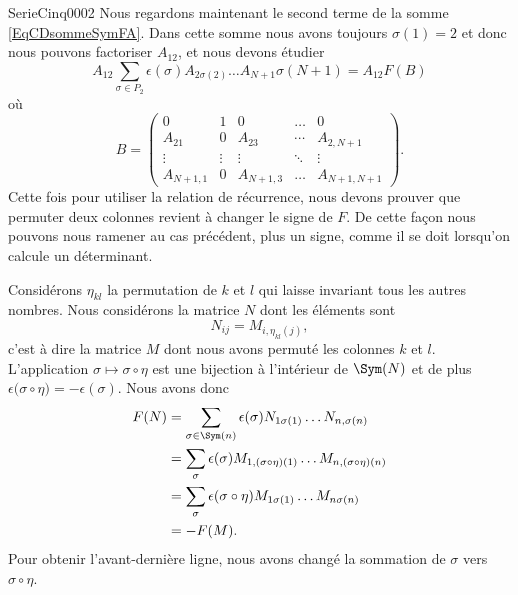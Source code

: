 \begin{corrige}{SerieCinq0002}
Nous regardons maintenant le second terme de la somme \eqref{EqCDsommeSymFA}. Dans cette somme nous avons toujours $\sigma(1)=2$ et donc nous pouvons factoriser $A_{12}$, et nous devons étudier
\begin{equation}
		A_{12}\sum_{\sigma\in P_2}\epsilon(\sigma)A_{2\sigma(2)}\ldots A_{N+1}\sigma(N+1)
		=A_{12}F(B)
\end{equation}
où
\begin{equation}
	B=\begin{pmatrix}
		0		&	1	&	0	&	\ldots	&	0\\	
		A_{21}		&	0	&	A_{23}	&	\cdots	&	A_{2,N+1}\\	
		\vdots		&	\vdots	&	\vdots	&	\ddots	&	\vdots\\	
		A_{N+1,1}	&	0	&	A_{N+1,3}	&	\ldots	&	A_{N+1,N+1}	
	\end{pmatrix}.
\end{equation}
Cette fois pour utiliser la relation de récurrence, nous devons prouver que permuter deux colonnes revient à changer le signe de $F$. De cette façon nous pouvons nous ramener au cas précédent, plus un signe, comme il se doit lorsqu'on calcule un déterminant.

Considérons $\eta_{kl}$ la permutation de $k$ et $l$ qui laisse invariant tous les autres nombres. Nous considérons la matrice $N$ dont les éléments sont 
\begin{equation}
	N_{ij}=M_{i,\eta_{kl}(j)},
\end{equation}
c'est à dire la matrice $M$ dont nous avons permuté les colonnes $k$ et $l$. L'application $\sigma\mapsto\sigma\circ\eta$ est une bijection à l'intérieur de $\Sym(N)$ et de plus $\epsilon\Big( \sigma\circ\eta \Big)=-\epsilon(\sigma)$. Nous avons donc
\begin{equation}
	\begin{aligned}[]
		F(N)&=\sum_{\sigma\in\Sym(n)}\epsilon(\sigma)N_{1\sigma(1)}\ldots N_{n,\sigma(n)}\\
		&=\sum_{\sigma}\epsilon(\sigma)M_{1,(\sigma\circ\eta)(1)}\ldots M_{n,(\sigma\circ\eta)(n)}\\
		&=\sum_{\sigma}\epsilon(\sigma\circ\eta)M_{1\sigma(1)}\ldots M_{n\sigma(n)}\\
		&=-F(M).
	\end{aligned}
\end{equation}
Pour obtenir l'avant-dernière ligne, nous avons changé la sommation de $\sigma$ vers $\sigma\circ\eta$.

\end{corrige}
